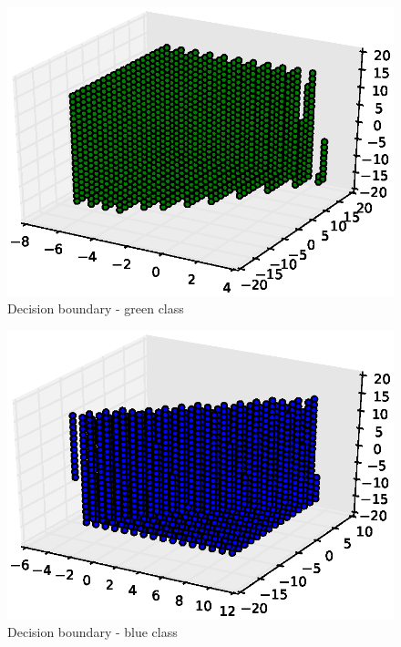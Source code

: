 \documentclass[a4paper,10pt]{article}
\begin{document}
\begin{figure}[htb]
 \centering
 \includegraphics[scale=0.6]{./figures/4f3.eps}
 \caption{Decision boundary - green class}
 \label{fig:4f3}
\end{figure}

\begin{figure}[htb]
 \centering
 \includegraphics[scale=0.6]{./figures/4f4.eps}
 \caption{Decision boundary - blue class}
 \label{fig:4f4}
\end{figure}
\end{document}
